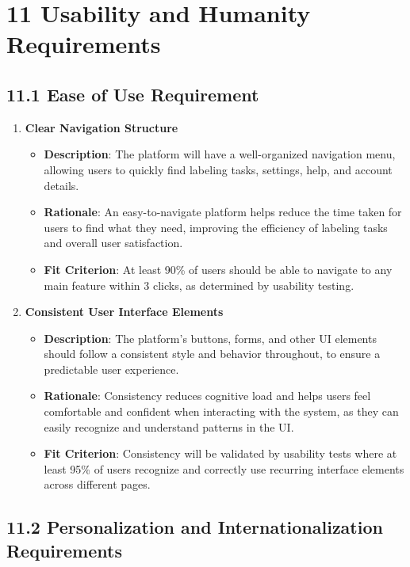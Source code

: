 \documentclass[12pt]{article}
\begin{document}
\section*{11 Usability and Humanity Requirements}

\subsection*{11.1 Ease of Use Requirement}


\begin{enumerate}
    \item \textbf{Clear Navigation Structure}  
        \begin{itemize}[leftmargin=2cm]
            \item \textbf{Description}: The platform will have a well-organized navigation menu, allowing users to quickly find labeling tasks, settings, help, and account details.  
            \item \textbf{Rationale}: An easy-to-navigate platform helps reduce the time taken for users to find what they need, improving the efficiency of labeling tasks and overall user satisfaction.  
            \item \textbf{Fit Criterion}: At least 90\% of users should be able to navigate to any main feature within 3 clicks, as determined by usability testing.
        \end{itemize}
    \item \textbf{Consistent User Interface Elements}  
        \begin{itemize}[leftmargin=2cm]
            \item \textbf{Description}: The platform’s buttons, forms, and other UI elements should follow a consistent style and behavior throughout, to ensure a predictable user experience.  
            \item \textbf{Rationale}: Consistency reduces cognitive load and helps users feel comfortable and confident when interacting with the system, as they can easily recognize and understand patterns in the UI.  
            \item \textbf{Fit Criterion}: Consistency will be validated by usability tests where at least 95\% of users recognize and correctly use recurring interface elements across different pages.
        \end{itemize}
\end{enumerate}

\subsection*{11.2 Personalization and Internationalization Requirements}
\end{document}
